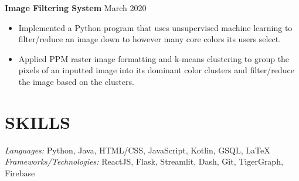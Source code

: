 \documentclass[11pt]{res}
\begin{document}
\begin{footnotesize}
\begin{resume}
\begin{itemize}
\end{itemize}
\vspace{-2.5mm}
\textbf{Image Filtering System} \hfill March 2020\vspace{-5.25mm}
\begin{itemize} \itemsep -2pt
\item Implemented a Python program that uses unsupervised machine learning to filter/reduce an image down to however many core colors its users select.
\vspace{1mm}
\item Applied PPM raster image formatting and k-means clustering to group the pixels of an inputted image into its dominant color clusters and filter/reduce the image based on the clusters. 
\end{itemize}
\section{SKILLS} 
{\sl Languages:} 
Python, Java, HTML/CSS, JavaScript, Kotlin, GSQL, \LaTeX \\
{\sl Frameworks/Technologies:} ReactJS, Flask, Streamlit, Dash, Git, TigerGraph, Firebase

\end{resume}
\end{footnotesize}
\end{document}
